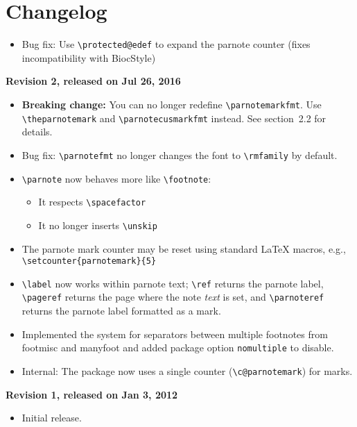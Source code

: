 \documentclass[10pt]{article}
\renewcommand{\parnotefmt}[1]{\centerline{\colorbox{black!10}{\parbox{0.82\textwidth}{\footnotesize\sffamily\noindent #1}}}}
\begin{document}
\section{Changelog}
{\raggedright
\noindent{}
\begin{itemize}
\item Bug fix: Use \verb+\protected@edef+ to expand the parnote counter (fixes incompatibility with \textsf{BiocStyle})
\end{itemize}
\noindent\textbf{Revision 2, released on Jul 26, 2016}
\begin{itemize}
\item \textbf{Breaking change:} You can no longer redefine \verb+\parnotemarkfmt+. Use \verb+\theparnotemark+ and \verb+\parnotecusmarkfmt+ instead. See section~2.2 for details.
\item Bug fix: \verb+\parnotefmt+ no longer changes the font to \verb+\rmfamily+ by default.
\item \verb+\parnote+ now behaves more like \verb+\footnote+:
	\begin{itemize}
	\item It respects \verb+\spacefactor+
	\item It no longer inserts \verb+\unskip+
	\end{itemize}
\item The parnote mark counter may be reset using standard LaTeX macros, e.g., \verb+\setcounter{parnotemark}{5}+
\item \verb+\label+ now works within parnote text; \verb+\ref+ returns the parnote label, \verb+\pageref+ returns the page where the note \emph{text} is set, and \verb+\parnoteref+ returns the parnote label formatted as a mark.
\item Implemented the system for separators between multiple footnotes from \textsf{footmisc} and \textsf{manyfoot} and added package option \texttt{nomultiple} to disable.
\item Internal: The package now uses a single counter (\verb+\c@parnotemark+) for marks.
\end{itemize}
\noindent\textbf{Revision 1, released on Jan 3, 2012}
\begin{itemize}
\item Initial release.
\end{itemize}}
\end{document}
